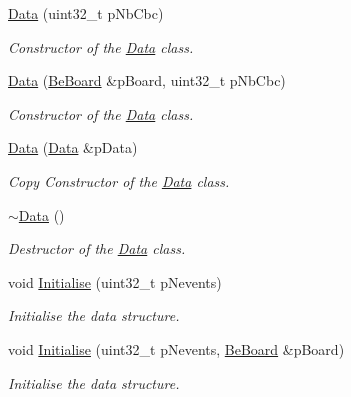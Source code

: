 \begin{DoxyCompactItemize}
\item 
\hyperlink{class_ph2___hw_interface_1_1_data_a4cbcbfc2a023f0e826253fc7308ebb17}{Data} (uint32\-\_\-t p\-Nb\-Cbc)
\begin{DoxyCompactList}\small\item\em Constructor of the \hyperlink{class_ph2___hw_interface_1_1_data}{Data} class. \end{DoxyCompactList}\item 
\hyperlink{class_ph2___hw_interface_1_1_data_a6b19ec929731107ee1bf288493b2ee7a}{Data} (\hyperlink{class_ph2___hw_description_1_1_be_board}{Be\-Board} \&p\-Board, uint32\-\_\-t p\-Nb\-Cbc)
\begin{DoxyCompactList}\small\item\em Constructor of the \hyperlink{class_ph2___hw_interface_1_1_data}{Data} class. \end{DoxyCompactList}\item 
\hyperlink{class_ph2___hw_interface_1_1_data_aefcb0c450523abe1c4397189f64a3aff}{Data} (\hyperlink{class_ph2___hw_interface_1_1_data}{Data} \&p\-Data)
\begin{DoxyCompactList}\small\item\em Copy Constructor of the \hyperlink{class_ph2___hw_interface_1_1_data}{Data} class. \end{DoxyCompactList}\item 
\hyperlink{class_ph2___hw_interface_1_1_data_a889228098e5c0b4eb5d06ad7850cdd7e}{$\sim$\-Data} ()
\begin{DoxyCompactList}\small\item\em Destructor of the \hyperlink{class_ph2___hw_interface_1_1_data}{Data} class. \end{DoxyCompactList}\item 
void \hyperlink{class_ph2___hw_interface_1_1_data_ab3a85993abf1f3981ab917b5f87c4000}{Initialise} (uint32\-\_\-t p\-Nevents)
\begin{DoxyCompactList}\small\item\em Initialise the data structure. \end{DoxyCompactList}\item 
void \hyperlink{class_ph2___hw_interface_1_1_data_a4d6bcb42ecdaa4b5763a3b8279f22599}{Initialise} (uint32\-\_\-t p\-Nevents, \hyperlink{class_ph2___hw_description_1_1_be_board}{Be\-Board} \&p\-Board)
\begin{DoxyCompactList}\small\item\em Initialise the data structure. \end{DoxyCompactList}\item 

\end{DoxyCompactItemize}
